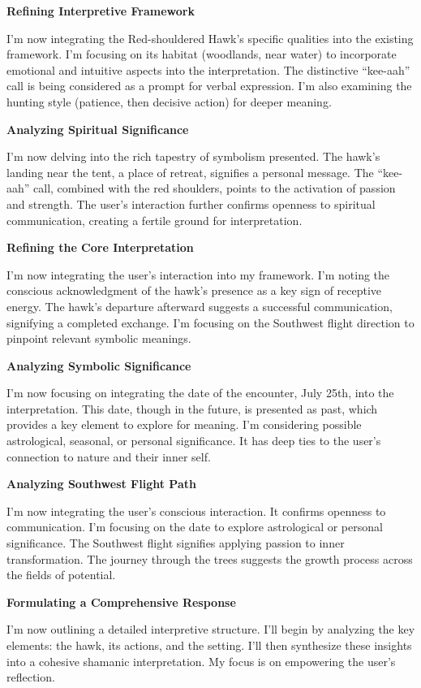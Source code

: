 \documentclass{article}
\begin{document}
\textbf{Refining Interpretive Framework}

I'm now integrating the Red-shouldered Hawk's specific qualities into
the existing framework. I'm focusing on its habitat (woodlands, near
water) to incorporate emotional and intuitive aspects into the
interpretation. The distinctive ``kee-aah'' call is being considered as
a prompt for verbal expression. I'm also examining the hunting style
(patience, then decisive action) for deeper meaning.

\textbf{Analyzing Spiritual Significance}

I'm now delving into the rich tapestry of symbolism presented. The
hawk's landing near the tent, a place of retreat, signifies a personal
message. The ``kee-aah'' call, combined with the red shoulders, points
to the activation of passion and strength. The user's interaction
further confirms openness to spiritual communication, creating a fertile
ground for interpretation.

\textbf{Refining the Core Interpretation}

I'm now integrating the user's interaction into my framework. I'm noting
the conscious acknowledgment of the hawk's presence as a key sign of
receptive energy. The hawk's departure afterward suggests a successful
communication, signifying a completed exchange. I'm focusing on the
Southwest flight direction to pinpoint relevant symbolic meanings.

\textbf{Analyzing Symbolic Significance}

I'm now focusing on integrating the date of the encounter, July 25th,
into the interpretation. This date, though in the future, is presented
as past, which provides a key element to explore for meaning. I'm
considering possible astrological, seasonal, or personal significance.
It has deep ties to the user's connection to nature and their inner
self.

\textbf{Analyzing Southwest Flight Path}

I'm now integrating the user's conscious interaction. It confirms
openness to communication. I'm focusing on the date to explore
astrological or personal significance. The Southwest flight signifies
applying passion to inner transformation. The journey through the trees
suggests the growth process across the fields of potential.

\textbf{Formulating a Comprehensive Response}

I'm now outlining a detailed interpretive structure. I'll begin by
analyzing the key elements: the hawk, its actions, and the setting. I'll
then synthesize these insights into a cohesive shamanic interpretation.
My focus is on empowering the user's reflection.
\end{document}
